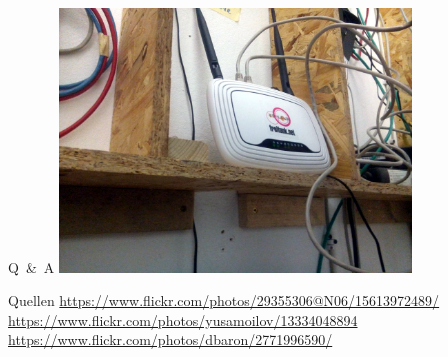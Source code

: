 \documentclass[10pt]{beamer}
\begin{document}
\begin{frame}{Q~\&~A}
\vfill
\centering
\includegraphics[width=0.7\textwidth]{images/irl_router}
\vfill
\end{frame}

\begin{frame}{Quellen}
\url{https://www.flickr.com/photos/29355306@N06/15613972489/}\\
\url{https://www.flickr.com/photos/yusamoilov/13334048894}\\
\url{https://www.flickr.com/photos/dbaron/2771996590/}
\end{frame}
\end{document}
